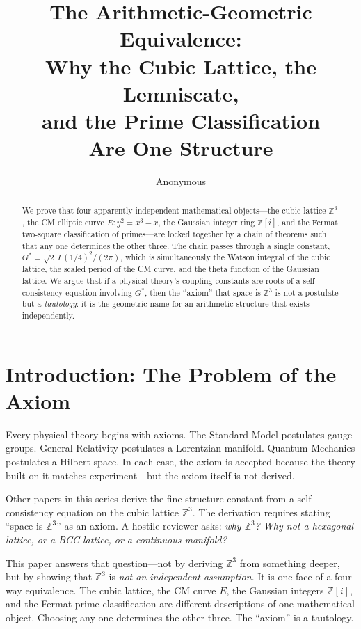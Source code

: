 \documentclass[12pt]{article}
\title{\textbf{The Arithmetic-Geometric Equivalence: \\[0.3cm]
Why the Cubic Lattice, the Lemniscate, \\
and the Prime Classification \\
Are One Structure}}
\author{Anonymous}
\date{}
\theoremstyle{definition}
\theoremstyle{remark}
\begin{document}
\maketitle

\begin{abstract}
\noindent We prove that four apparently independent mathematical objects---the cubic lattice $\mathbb{Z}^3$, the CM elliptic curve $E\!: y^2 = x^3 - x$, the Gaussian integer ring $\mathbb{Z}[i]$, and the Fermat two-square classification of primes---are locked together by a chain of theorems such that any one determines the other three. The chain passes through a single constant, $G^* = \sqrt{2}\,\Gamma(1/4)^2/(2\pi)$, which is simultaneously the Watson integral of the cubic lattice, the scaled period of the CM curve, and the theta function of the Gaussian lattice. We argue that if a physical theory's coupling constants are roots of a self-consistency equation involving $G^*$, then the ``axiom'' that space is $\mathbb{Z}^3$ is not a postulate but a \emph{tautology}: it is the geometric name for an arithmetic structure that exists independently.
\end{abstract}

\tableofcontents

\section{Introduction: The Problem of the Axiom}

Every physical theory begins with axioms. The Standard Model postulates gauge groups. General Relativity postulates a Lorentzian manifold. Quantum Mechanics postulates a Hilbert space. In each case, the axiom is accepted because the theory built on it matches experiment---but the axiom itself is not derived.

Other papers in this series derive the fine structure constant from a self-consistency equation on the cubic lattice $\mathbb{Z}^3$. The derivation requires stating ``space is $\mathbb{Z}^3$'' as an axiom. A hostile reviewer asks: \emph{why $\mathbb{Z}^3$? Why not a hexagonal lattice, or a BCC lattice, or a continuous manifold?}

This paper answers that question---not by deriving $\mathbb{Z}^3$ from something deeper, but by showing that $\mathbb{Z}^3$ is \emph{not an independent assumption}. It is one face of a four-way equivalence. The cubic lattice, the CM curve $E$, the Gaussian integers $\mathbb{Z}[i]$, and the Fermat prime classification are different descriptions of one mathematical object. Choosing any one determines the other three. The ``axiom'' is a tautology.
\end{document}
